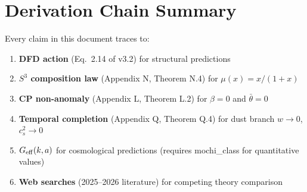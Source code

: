 \documentclass[11pt]{article}
\begin{document}
\section*{Derivation Chain Summary}

Every claim in this document traces to:
\begin{enumerate}
\item \textbf{DFD action} (Eq.~2.14 of v3.2) for structural predictions
\item \textbf{$S^3$ composition law} (Appendix N, Theorem N.4) for
  $\mu(x) = x/(1+x)$
\item \textbf{CP non-anomaly} (Appendix L, Theorem L.2) for
  $\beta = 0$ and $\bar{\theta} = 0$
\item \textbf{Temporal completion} (Appendix Q, Theorem Q.4) for
  dust branch $w \to 0$, $c_s^2 \to 0$
\item \textbf{$G_{\rm eff}(k,a)$} for cosmological predictions
  (requires mochi\_class for quantitative values)
\item \textbf{Web searches} (2025--2026 literature) for competing
  theory comparison
\end{enumerate}
\end{document}
